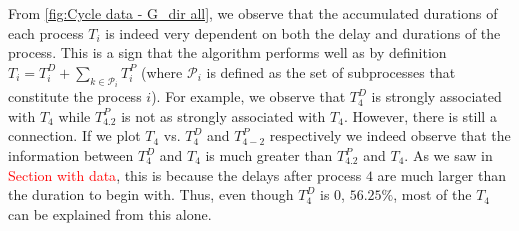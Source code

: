 \documentclass[../Thesis.tex]{subfiles}
\begin{document}
From \autoref{fig:Cycle data - G_dir all}, we observe that the accumulated durations of each process $T_i$ is indeed very dependent on both the delay and durations of the process. This is a sign that the algorithm performs well as by definition $T_i = T^D_i + \sum_{k\in \mathcal{P}_i} T^P_i$ (where $\mathcal{P}_i$ is defined as the set of subprocesses that constitute the process $i$). For example, we observe that $T^D_4$ is strongly associated with $T_4$ while $T^P_{4.2}$ is not as strongly associated with $T_4$. However, there is still a connection. If we plot $T_4$ vs. $T^D_4$ and $T^P_{4-2}$ respectively we indeed observe that the information between $T^D_4$ and $T_4$ is much greater than $T^P_{4.2}$ and $T_4$. As we saw in \textcolor{red}{Section with data}, this is because the delays after process $4$ are much larger than the duration to begin with. Thus, even though $T^D_4$ is $0$, $56.25\%$, most of the $T_4$ can be explained from this alone.
\end{document}
